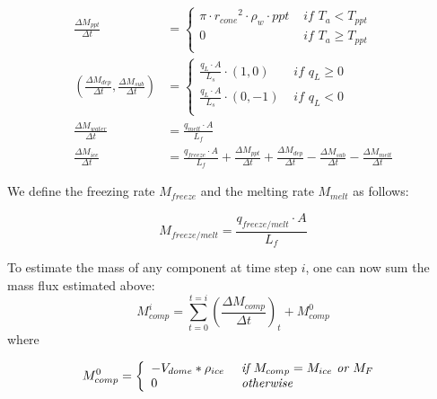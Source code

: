 \documentclass[utf8]{frontiersSCNS} %
\begin{document}
\begin{subequations}
	\label{equations}
	\begin{align}
		\label{eq:ppt}
		\frac{\Delta M_{ppt}}{\Delta t}                                    & = \left\{ \begin{array}{ll} \pi \cdot {r_{cone}}^2 \cdot
			\rho_{w}\cdot ppt & \textit{ if } T_{a} < T_{ppt} \\ 0 & \textit{ if } T_{a} \geq T_{ppt} \\\end{array} \right.                                      \\
		\label{eq:vap}
		(\frac{\Delta M_{dep}}{\Delta t}, \frac{\Delta M_{sub}}{\Delta t}) & = \left\{ \begin{array}{ll} \frac{q_{L}
			\cdot A}{L_s}\cdot (1,0)  & \textit{ if } q_{L} \geq 0 \\ \frac{q_{L}
			\cdot A}{L_s}\cdot (0,-1) & \textit{ if } q_{L} < 0    \\\end{array} \right.                                      \\
		\label{eq:mwat}
		\frac{\Delta M_{water}}{\Delta t}                                  & = \frac{q_{melt} \cdot A }{L_f}                                                   \\
		\label{eq:mcone}
		\frac{\Delta M_{ice}}{\Delta t}                                    & = \frac{q_{freeze}\cdot A }{L_f} + \frac{\Delta M_{ppt}}{\Delta t} + \frac{\Delta
			M_{dep}}{\Delta t}- \frac{\Delta M_{sub}}{\Delta t}- \frac{\Delta M_{melt}}{\Delta t}
	\end{align}
\end{subequations}

We define the freezing rate $M_{freeze}$ and the melting rate $M_{melt}$ as follows:

\begin{equation}
	M_{freeze/melt} = \frac{q_{freeze/melt} \cdot A }{L_f}
	\label{eq:m_freeze/melt}
\end{equation}

To estimate the mass of any component at time step $i$, one can now sum the mass flux estimated above: \begin{equation}
	M_{comp}^i = \sum_{t=0}^{t=i} (\frac{\Delta M_{comp}}{\Delta t})_{t} + M_{comp}^0 \end{equation} where

\begin{equation} M_{comp}^0 = \left\{ \begin{array}{ll} -V_{dome} * \rho_{ice} & \textit{ if } M_{comp}=
             M_{ice}\textit{ or }
             M_{F}                                                 \\ 0 & \textit{ otherwise }\\\end{array} \right. \\
\end{equation}
\end{document}
